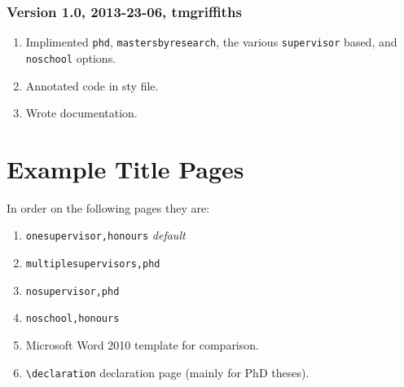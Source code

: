 \documentclass[12pt,oneside]{article}
\newcommand{\oporcom}[1]{\texttt{\color{RoyalBlue}#1}} %
\begin{document}
\subsubsection*{Version 1.0, 2013-23-06, tmgriffiths}
\begin{enumerate}
    \item Implimented \oporcom{phd}, \oporcom{mastersbyresearch}, the various \oporcom{supervisor} based, and \oporcom{noschool} options.
    \item Annotated code in sty file.
    \item Wrote documentation.
\end{enumerate}

\section{Example Title Pages}
In order on the following pages they are:
\begin{enumerate}
    \item \oporcom{onesupervisor,honours} \emph{default}
    \item \oporcom{multiplesupervisors,phd}
    \item \oporcom{nosupervisor,phd}
    \item \oporcom{noschool,honours}
    \item Microsoft Word 2010 template for comparison.
    \item \oporcom{\textbackslash{}declaration} declaration page (mainly for PhD theses).
\end{enumerate}






\end{document}
